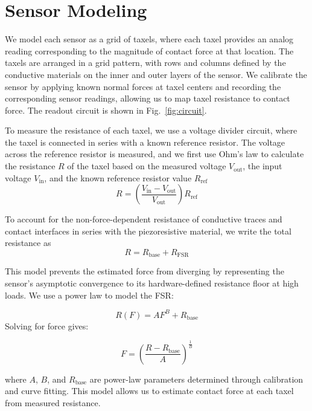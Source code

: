 

\section{Sensor Modeling}


We model each sensor as a grid of taxels, where each taxel provides an analog reading corresponding to the magnitude of contact force at that location. The taxels are arranged in a grid pattern, with rows and columns defined by the conductive materials on the inner and outer layers of the sensor. We calibrate the sensor by applying known normal forces at taxel centers and recording the corresponding sensor readings, allowing us to map taxel resistance to contact force. The readout circuit is shown in Fig.~\ref{fig:circuit}.

To measure the resistance of each taxel, we use a voltage divider circuit, where the taxel is connected in series with a known reference resistor. The voltage across the reference resistor is measured, and we first use Ohm's law to calculate the resistance $R$ of the taxel based on the measured voltage $V_{\mathrm{out}}$, the input voltage $V_{\mathrm{in}}$, and the known reference resistor value $R_{\mathrm{ref}}$
\begin{equation}
R = \left( \frac{V_{\mathrm{in}}-V_{\mathrm{out}}}{V_{\mathrm{out}}} \right) R_{\mathrm{ref}} 
\end{equation}

To account for the non-force-dependent resistance of conductive traces and contact interfaces in series with the piezoresistive material, we write the total resistance as
\begin{equation}
R = R_{\mathrm{base}} + R_{\mathrm{FSR}}
\end{equation}

This model prevents the estimated force from diverging by representing the sensor's asymptotic convergence to its hardware-defined resistance floor at high loads. We use a power law to model the FSR:

\begin{equation}
R(F) = A F^{B} + R_{\mathrm{base}}
\end{equation}
Solving for force gives:

\begin{equation}
F=\left(\frac{R-R_{\mathrm{base}}}{A}\right)^{\frac{1}{B}}
\end{equation}

where $A$, $B$, and $R_{\mathrm{base}}$ are power-law parameters determined through calibration and curve fitting. This model allows us to estimate contact force at each taxel from measured resistance.


